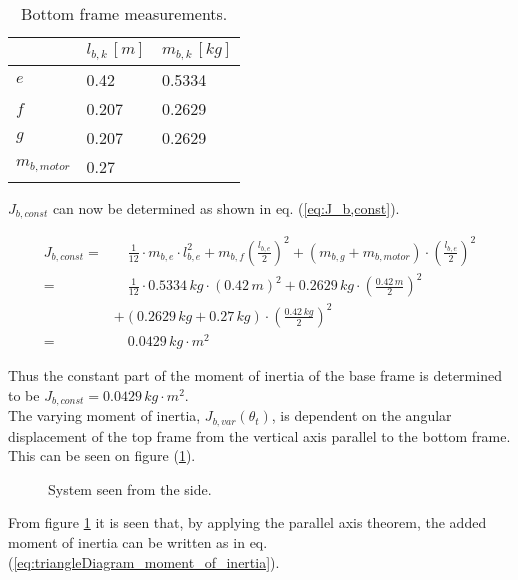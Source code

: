 \documentclass[../../main]{subfiles}
\begin{document}
\begin{table}[H]
\centering
\begin{tabular}{|l|l|l|}
\hline
  & $l_{b,k} \, \si{[m]}$ & $m_{b,k} \, \si{[kg]}$ \\
\hline
$e$           & 0.42  & 0.5334  \\
\hline
$f$           & 0.207  & 0.2629  \\
\hline
$g$           & 0.207 & 0.2629  \\
\hline
$m_{b,motor}$ & 0.27 & \\
\hline
\end{tabular}
\caption{Bottom frame measurements.}
    \label{tab:Base_frame_table}
\end{table}

$J_{b,const}$ can now be determined as shown in eq. (\ref{eq:J_b,const}).

\begin{equation}
  \label{eq:J_b,const}
  \begin{split}
      J_{b,const} =& \quad \frac{1}{12} \cdot m_{b,e} \cdot l_{b,e}^2 + m_{b,f} \left( \frac{l_{b,e}}{2} \right)^2 + (m_{b,g}+m_{b,motor}) \cdot \left(\frac{l_{b,e}}{2}\right)^2\\
      =& \quad \frac{1}{12} \cdot 0.5334\si{\,kg} \cdot (0.42 \si{\,m})^2 + 0.2629\si{\,kg} \cdot \left( \frac{0.42 \si{\,m}}{2} \right)^2 \\
      &+ (0.2629\si{\,kg}+0.27\si{\,kg}) \cdot \left(\frac{0.42 \si{\,kg}}{2}\right)^2\\
      =& \quad 0.0429 \si{\,kg\cdot m^2}
  \end{split}
\end{equation}

Thus the constant part of the moment of inertia of the base frame is determined to be $J_{b,const} = 0.0429 \si{\,kg\cdot m^2}$.\\
The varying moment of inertia, $J_{b,var}(\theta_t)$, is dependent on the angular displacement of the top frame from the vertical axis parallel to the bottom frame. This can be seen on figure (\ref{fig:TrekantDiagram}).

\begin{figure}[H]
  \centering
  \def\svgwidth{0.4\columnwidth}
  
  \caption{System seen from the side.}
  \label{fig:TrekantDiagram}
\end{figure}

From figure \ref{fig:TrekantDiagram} it is seen that, by applying the parallel axis theorem, the added moment of inertia can be written as in eq. (\ref{eq:triangleDiagram_moment_of_inertia}).
\end{document}
